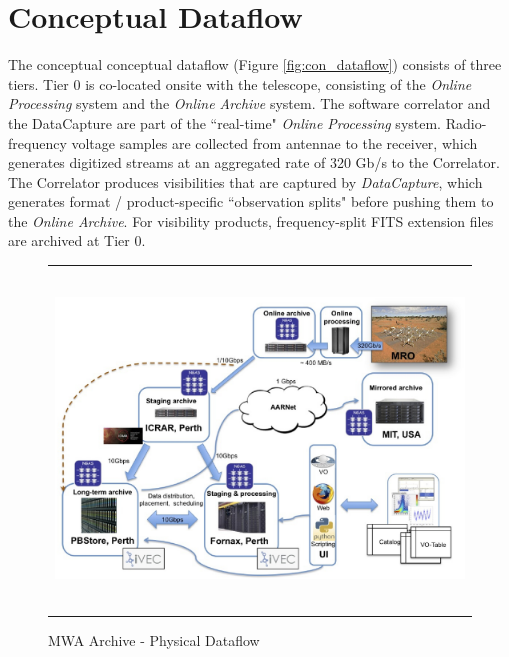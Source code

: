 \documentclass[11pt,twoside]{article}
\begin{document}
\section{Conceptual Dataflow}
The conceptual conceptual dataflow (Figure \ref{fig:con_dataflow}) consists of three tiers. Tier 0 is co-located onsite with the telescope, consisting of the \emph{Online Processing} system and the \emph{Online Archive} system. The software correlator and the DataCapture are part of the ``real-time" \emph{Online Processing} system. Radio-frequency voltage samples are collected from antennae to the receiver, which generates digitized streams at an aggregated rate of 320 Gb/s to the Correlator. The Correlator produces visibilities that are captured by \emph{DataCapture}, which generates format / product-specific ``observation splits" before pushing them to the \emph{Online Archive}. For visibility products, frequency-split FITS extension files are archived at Tier 0.
   \begin{figure}
   \begin{center}
   \begin{tabular}{c}
   \includegraphics[height=9cm]{P34_f2.eps}
   \end{tabular}
   \end{center}
   \caption[example] 
   { \label{fig:phy_dataflow} 
MWA Archive - Physical Dataflow}
   \end{figure} 
\end{document}
